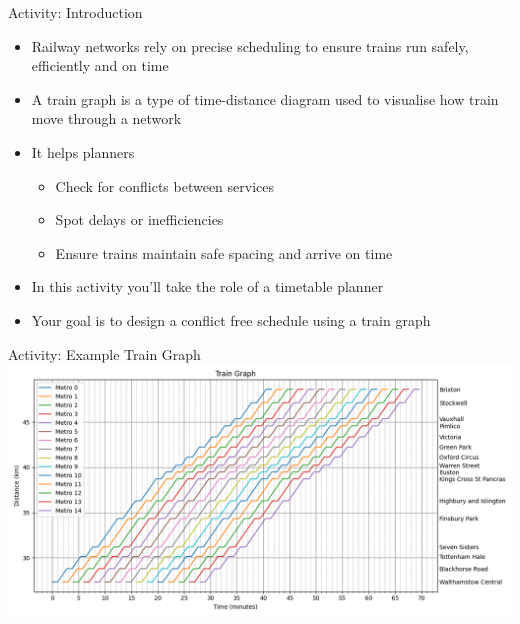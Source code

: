 \documentclass[
    aspectratio=169
]{beamer}
\begin{document}
\begin{frame}{Activity: Introduction}
	\begin{itemize}
		\item Railway networks rely on precise scheduling to ensure trains run safely, efficiently and on time
		\item A train graph is a type of time-distance diagram used to visualise how train move through a network
		\item It helps planners
		\begin{itemize}
			\item Check for conflicts between services
			\item Spot delays or inefficiencies
			\item Ensure trains maintain safe spacing and arrive on time
		\end{itemize}
		\item In this activity you'll take the role of a timetable planner
		\item Your goal is to design a conflict free schedule using a train graph
	\end{itemize}
\end{frame}

\begin{frame}{Activity: Example Train Graph}
	\includegraphics[width=\textwidth]{../train-generator/output/victoria.png}
\end{frame}
\end{document}
